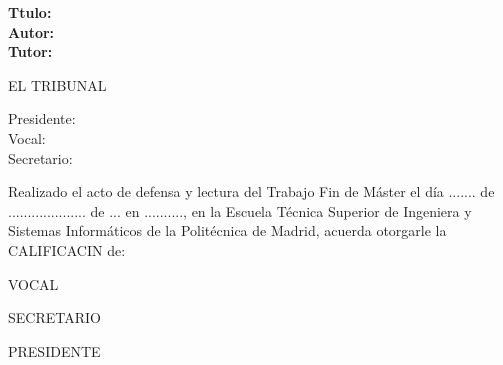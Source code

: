 \cleardoublepage

\begin{flushleft} \large
\textbf{Ttulo:} \TFM \\
\textbf{Autor:} \ME \\
\textbf{Tutor:} \TUTOR \\

\end{flushleft}

\hfill \break
\begin{center} \LARGE
EL TRIBUNAL \\ [1 cm]
\end{center}

\begin{flushleft} \LARGE
Presidente: \\ [1 cm]
Vocal: \\ [1 cm]
Secretario: \\ [1.5 cm]
\end{flushleft}

\large
Realizado el acto de defensa y lectura del Trabajo Fin de Máster el día
 ....... de ....................   de ... en .........., en la Escuela Técnica Superior
 de Ingeniera y Sistemas Informáticos de la Politécnica de Madrid, acuerda otorgarle la
 CALIFICACIN de: \\ [2 cm]

\begin{center}
 \large VOCAL \\ [2.2 cm]
\end{center}

\begin{minipage}{0.5\textwidth}
 \begin{flushleft}
 \large SECRETARIO
\end{flushleft}
\end{minipage}
\begin{minipage}{0.5\textwidth}
\begin{flushright}
 \large PRESIDENTE
\end{flushright}
\end{minipage}